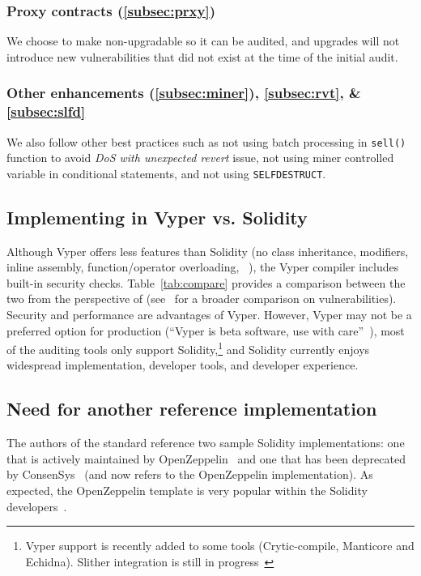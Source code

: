\subsubsection{Proxy contracts (\ref{subsec:prxy})}
We choose to make \sys non-upgradable so it can be audited, and upgrades will not introduce new vulnerabilities that did not exist at the time of the initial audit. 
	
\subsubsection{Other enhancements (\ref{subsec:miner}), \ref{subsec:rvt}, \& \ref{subsec:slfd}}
We also follow other best practices such as not using batch processing in \texttt{sell()} function to avoid \textit{DoS with unexpected revert} issue, not using miner controlled variable in conditional statements, and not using \texttt{SELFDESTRUCT}.

\subsection{Implementing in Vyper vs. Solidity}
Although Vyper offers less features than Solidity (\eg no class inheritance, modifiers, inline assembly, function/operator overloading, \etc~\cite{SolidityDoc}), the Vyper compiler includes built-in security checks. Table~\ref{tab:compare} provides a comparison between the two from the perspective of \sys (see~\cite{Vyper1} for a broader comparison on vulnerabilities). Security and performance are advantages of Vyper. However, Vyper may not be a preferred option for production (``Vyper is beta software, use with care''~\cite{VyperReadme}), most of the auditing tools only support Solidity,\footnote{Vyper support is recently added to some tools (\eg Crytic-compile, Manticore and Echidna). Slither integration is still in progress~\cite{Crytic}} and Solidity currently enjoys widespread  implementation, developer tools, and developer experience.


	
\subsection{Need for another reference implementation}
The authors of the \erc standard reference two sample Solidity implementations: one that is actively maintained by OpenZeppelin~\cite{OpenZepplin} and one that has been deprecated by ConsenSys~\cite{ConsensysToken} (and now refers to the OpenZeppelin implementation). As expected, the OpenZeppelin template is very popular within the Solidity developers~\cite{OPZ1,OPZ2,OPZ3}.

